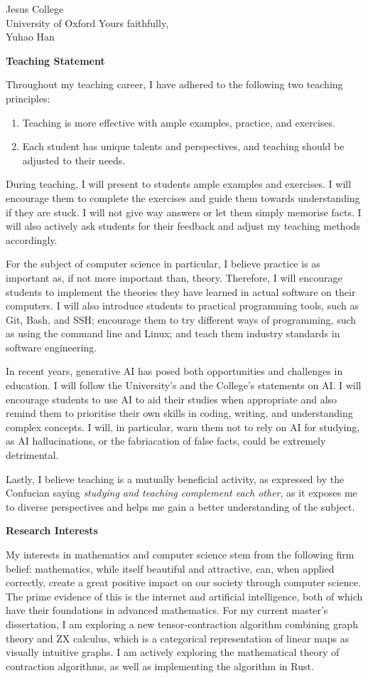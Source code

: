 \documentclass{letter}
\begin{document}
\begin{letter}{Jesus College \\ University of Oxford}
Yours faithfully,\\
Yuhao Han

\newpage

\textbf{Teaching Statement}

Throughout my teaching career, I have adhered to the following two teaching principles:
\begin{enumerate}
   \item Teaching is more effective with ample examples, practice, and exercises.
   \item Each student has unique talents and perspectives, and teaching should be adjusted to their needs.
\end{enumerate}

During teaching, I will present to students ample examples and exercises. I will encourage them to complete the exercises and guide them towards understanding if they are stuck.
I will not give way answers or let them simply memorise facts.
I will also actively ask students for their feedback and adjust my teaching methods accordingly.

For the subject of computer science in particular, I believe practice is as important as, if not more important than, theory.
Therefore, I will encourage students to implement the theories they have learned in actual software on their computers.
I will also introduce students to practical programming tools, such as Git, Bash, and SSH; encourage them to try different ways of programming, such as using the command line and Linux; and teach them industry standards in software engineering.

In recent years, generative AI has posed both opportunities and challenges in education. 
I will follow the University's and the College's statements on AI.
I will encourage students to use AI to aid their studies when appropriate and also remind them to prioritise their own skills in coding, writing, and understanding complex concepts.
I will, in particular, warn them not to rely on AI for studying, as AI hallucinations, or the fabriacation of false facts, could be extremely detrimental.

Lastly, I believe teaching is a mutually beneficial activity, as expressed by the Confucian saying \textit{studying and teaching complement each other}, as it exposes me to diverse perspectives and helps me gain a better understanding of the subject.

\textbf{Research Interests}

My interests in mathematics and computer science stem from the following firm belief: mathematics, while itself beautiful and attractive, can, when applied correctly, create a great positive impact on our society through computer science.
The prime evidence of this is the internet and artificial intelligence, both of which have their foundations in advanced mathematics.
For my current master's dissertation, I am exploring a new tensor-contraction algorithm combining graph theory and ZX calculus, which is a categorical representation of linear maps as visually intuitive graphs.
I am actively exploring the mathematical theory of contraction algorithms, as well as implementing the algorithm in Rust.


\end{letter}
\end{document}
